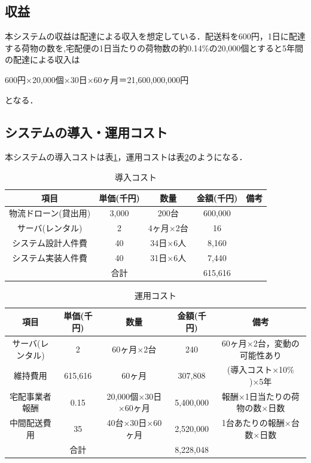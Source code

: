 \documentclass[a4paper, titlepage]{jsarticle}
\begin{document}
\subsection{収益}
本システムの収益は配達による収入を想定している．配送料を600円，1日に配達する荷物の数を,宅配便の1日当たりの荷物数の約0.14\%の20,000個とすると5年間の配達による収入は
\begin{center}
  600円×20,000個×30日×60ヶ月＝21,600,000,000円
\end{center}
となる．

\subsection{システムの導入・運用コスト}
本システムの導入コストは表\ref{tab:label1}，運用コストは表\ref{tab:label2}のようになる．
\begin{table}[H]
  \centering
  \caption{導入コスト}
  \begin{tabular}{c c c c c}
    \hline
    項目 & 単価(千円) & 数量 & 金額(千円) & 備考 \\
    \hline \hline
    物流ドローン(貸出用) & 3,000 & 200台 & 600,000 & \\
    サーバ(レンタル) & 2 & 4ヶ月×2台 & 16 & \\
    システム設計人件費 & 40 & 34日×6人 & 8,160 & \\
    システム実装人件費 & 40 & 31日×6人 & 7,440 & \\
    \hline \hline
    & 合計 & & 615,616 & \\
    \hline
  \end{tabular}
  \label{tab:label1}
\end{table}

\begin{table}[H]
  \centering
  \caption{運用コスト}
  \begin{tabular}{c c c c c}
    \hline
    項目 & 単価(千円) & 数量 & 金額(千円) & 備考 \\
    \hline \hline
    サーバ(レンタル) & 2 & 60ヶ月×2台 & 240 & 60ヶ月×2台，変動の可能性あり \\
    維持費用 & 615,616 & 60ヶ月 & 307,808 & (導入コスト×10\% )×5年 \\
    宅配事業者報酬 & 0.15 & 20,000個×30日×60ヶ月 & 5,400,000 & 報酬×1日当たりの荷物の数×日数 \\
    中間配送費用 & 35 & 40台×30日×60ヶ月 & 2,520,000 & 1台あたりの報酬×台数×日数 \\
    \hline \hline
    & 合計 & & 8,228,048 & \\
    \hline
  \end{tabular}
  \label{tab:label2}
\end{table}
\end{document}
